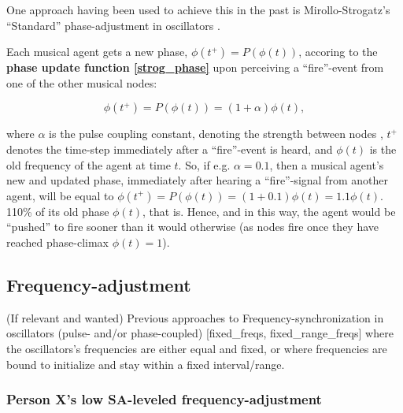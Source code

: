 	One approach having been used to achieve this in the past is Mirollo-Strogatz's ``Standard'' phase-adjustment in oscillators \cite{mirollo_strogatz_PCO_synch}.
	
	Each musical agent gets a new phase, $\phi(t^+) = P(\phi(t))$, accoring to the \textbf{phase update function \eqref{strog_phase}} upon perceiving a ``fire''-event from one of the other musical nodes:
	
	\begin{equation}
	\label{strog_phase}
		\phi(t^+) = P(\phi(t)) = (1 + \alpha)\phi(t)	,
	\end{equation}
	
	where $\alpha$ is the pulse coupling constant, denoting the strength between nodes \cite{nymoen_synch}, $t^+$ denotes the time-step immediately after a ``fire''-event is heard, and $\phi(t)$ is the old frequency of the agent at time $t$. So, if e.g. $\alpha = 0.1$, then a musical agent's new and updated phase, immediately after hearing a ``fire''-signal from another agent, will be equal to $\phi(t^+) = P(\phi(t)) = (1 + 0.1)\phi(t) = 1.1\phi(t)$. 110\% of its old phase $\phi(t)$, that is. Hence, and in this way, the agent would be ``pushed'' to fire sooner than it would otherwise (as nodes fire once they have reached phase-climax $\phi(t)=1$).

	
	
	
	\subsection{Frequency-adjustment}
	
	
	(If relevant and wanted) \nl
	Previous approaches to Frequency-synchronization in oscillators (pulse- and/or phase-coupled) [fixed\_freqs, fixed\_range\_freqs] where the oscillators's frequencies are either equal and fixed, or where frequencies are bound to initialize and stay within a fixed interval/range.
	
	
	\subsubsection{Person X's low SA-leveled frequency-adjustment}
	
	
